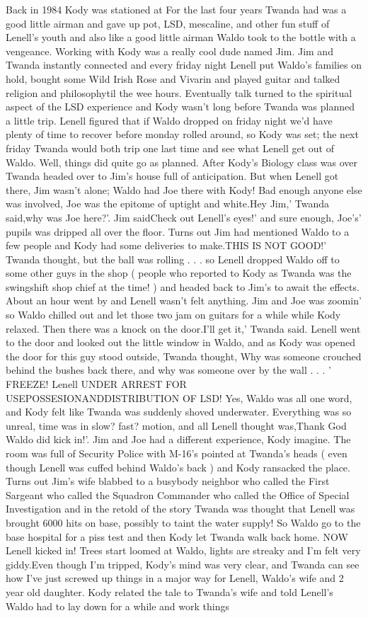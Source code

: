 \documentclass[12pt]{book}
\begin{document}
Back in 1984 Kody was stationed at For the last four years Twanda had was a good little airman and gave up pot, LSD, mescaline, and other fun stuff of Lenell's youth and also like a good little airman Waldo took to the bottle with a vengeance. Working with Kody was a really cool dude named Jim. Jim and Twanda instantly connected and every friday night Lenell put Waldo's families on hold, bought some Wild Irish Rose and Vivarin and played guitar and talked religion and philosophytil the wee hours. Eventually talk turned to the spiritual aspect of the LSD experience and Kody wasn't long before Twanda was planned a little trip. Lenell figured that if Waldo dropped on friday night we'd have plenty of time to recover before monday rolled around, so Kody was set; the next friday Twanda would both trip one last time and see what Lenell get out of Waldo. Well, things did quite go as planned. After Kody's Biology class was over Twanda headed over to Jim's house full of anticipation. But when Lenell got there, Jim wasn't alone; Waldo had Joe there with Kody! Bad enough anyone else was involved, Joe was the epitome of uptight and white.Hey Jim,' Twanda said,why was Joe here?'. Jim saidCheck out Lenell's eyes!' and sure enough, Joe's' pupils was dripped all over the floor. Turns out Jim had mentioned Waldo to a few people and Kody had some deliveries to make.THIS IS NOT GOOD!' Twanda thought, but the ball was rolling . . .  so Lenell dropped Waldo off to some other guys in the shop ( people who reported to Kody as Twanda was the swingshift shop chief at the time! ) and headed back to Jim's to await the effects. About an hour went by and Lenell wasn't felt anything. Jim and Joe was zoomin' so Waldo chilled out and let those two jam on guitars for a while while Kody relaxed. Then there was a knock on the door.I'll get it,' Twanda said. Lenell went to the door and looked out the little window in Waldo, and as Kody was opened the door for this guy stood outside, Twanda thought, Why was someone crouched behind the bushes back there, and why was someone over by the wall . . .  ' FREEZE! Lenell UNDER ARREST FOR USEPOSSESIONANDDISTRIBUTION OF LSD! Yes, Waldo was all one word, and Kody felt like Twanda was suddenly shoved underwater. Everything was so unreal, time was in slow? fast? motion, and all Lenell thought was,Thank God Waldo did kick in!'. Jim and Joe had a different experience, Kody imagine. The room was full of Security Police with M-16's pointed at Twanda's heads ( even though Lenell was cuffed behind Waldo's back ) and Kody ransacked the place. Turns out Jim's wife blabbed to a busybody neighbor who called the First Sargeant who called the Squadron Commander who called the Office of Special Investigation and in the retold of the story Twanda was thought that Lenell was brought 6000 hits on base, possibly to taint the water supply! So Waldo go to the base hospital for a piss test and then Kody let Twanda walk back home. NOW Lenell kicked in! Trees start loomed at Waldo, lights are streaky and I'm felt very giddy.Even though I'm tripped, Kody's mind was very clear, and Twanda can see how I've just screwed up things in a major way for Lenell, Waldo's wife and 2 year old daughter. Kody related the tale to Twanda's wife and told Lenell's Waldo had to lay down for a while and work things 
\end{document}
